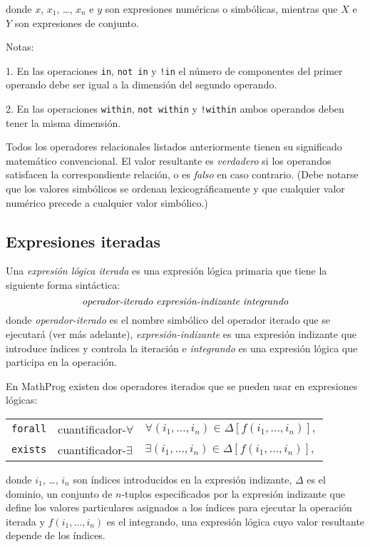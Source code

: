\documentclass[11pt,spanish]{report}
\begin{document}
\noindent donde $x$, $x_1$, \dots, $x_n$ e $y$ son expresiones numéricas o simbólicas, mientras que $X$ e $Y$ son expresiones de conjunto.

Notas:

1. En las operaciones {\tt in}, {\tt not in} y {\tt !in} el número de componentes del primer operando debe ser igual a la dimensión del segundo operando.

2. En las operaciones {\tt within}, {\tt not within} y {\tt !within} ambos operandos deben tener la misma dimensión.

Todos los operadores relacionales listados anteriormente tienen su significado matemático convencional. El valor resultante es {\it verdadero} si los operandos satisfacen la correspondiente relación, o es {\it falso} en caso contrario. (Debe notarse que los valores simbólicos se ordenan lexicográficamente y que cualquier valor numérico precede a cualquier valor simbólico.)

\subsection{Expresiones iteradas}

Una {\it expresión lógica iterada} es una expresión lógica primaria que tiene la siguiente forma sintáctica:
$$\mbox{{\it operador-iterado} {\it expresión-indizante}
{\it integrando}}$$
donde {\it operador-iterado} es el nombre simbólico del operador iterado que se ejecutará (ver más adelante), {\it expresión-indizante} es una expresión indizante que introduce índices y controla la iteración e {\it integrando} es una expresión lógica que participa en la operación.

En MathProg existen dos operadores iterados que se pueden usar en expresiones lógicas:

{\def\arraystretch{1.4}
\noindent\hfil
\begin{tabular}{@{}lll@{}}
{\tt forall}&cuantificador-$\forall$&$\displaystyle
\forall(i_1,\dots,i_n)\in\Delta[f(i_1,\dots,i_n)],$\\
{\tt exists}&cuantificador-$\exists$&$\displaystyle
\exists(i_1,\dots,i_n)\in\Delta[f(i_1,\dots,i_n)],$\\
\end{tabular}
}

\noindent donde $i_1$, \dots, $i_n$ son índices introducidos en la expresión indizante, $\Delta$ es el dominio, un conjunto de $n$-tuplos especificados por la expresión indizante que define los valores particulares asignados a los índices para ejecutar la operación iterada y $f(i_1,\dots,i_n)$ es el integrando, una expresión lógica cuyo valor resultante depende de los índices.
\end{document}
